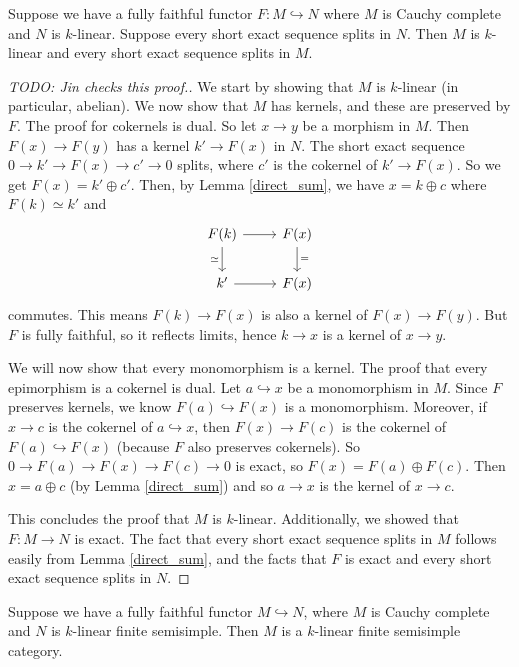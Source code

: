 \begin{lemma}\label{abelian}
  Suppose we have a fully faithful functor $F:M\hookrightarrow N$ where $M$ is
  Cauchy complete and $N$ is $k$-linear. Suppose every short exact sequence
  splits in $N$. Then $M$ is $k$-linear and every short exact sequence splits
  in $M$.
\end{lemma}

\begin{proof}
  [TODO: Jin checks this proof.]

  We start by showing that $M$ is $k$-linear (in particular, abelian). We now
  show that $M$ has kernels, and these are preserved by $F$. The proof for
  cokernels is dual. So let $x\to y$ be a morphism in $M$. Then $F(x)\to F(y)$ has
  a kernel $k'\to F(x)$ in $N$. The short exact sequence $0\to k'\to F(x)\to c'\to 0$
  splits, where $c'$ is the cokernel of $k'\to F(x)$. So we get $F(x)=k'\oplus c'$.
  Then, by Lemma \ref{direct_sum}, we have $x=k\oplus c$ where $F(k)\simeq k'$ and
  \[
    \begin{tikzcd}
      {F(k)} & {F(x)} \\
      {k'} & {F(x)} \arrow[from=1-1, to=1-2] \arrow["\simeq"', from=1-1, to=2-1] \arrow["{=}", from=1-2, to=2-2] \arrow[from=2-1, to=2-2]
    \end{tikzcd}
  \]
  commutes. This means $F(k)\to F(x)$ is also a kernel of $F(x)\to F(y)$. But
  $F$ is fully faithful, so it reflects limits, hence $k\to x$ is a kernel of
  $x\to y$.

  We will now show that every monomorphism is a kernel. The proof that every
  epimorphism is a cokernel is dual. Let $a\hookrightarrow x$ be a
  monomorphism in $M$. Since $F$ preserves kernels, we know
  $F(a)\hookrightarrow F(x)$ is a monomorphism. Moreover, if $x\to c$ is the
  cokernel of $a\hookrightarrow x$, then $F(x)\to F(c)$ is the cokernel of
  $F(a)\hookrightarrow F(x)$ (because $F$ also preserves cokernels). So $0\to F(a)\to F(x)\to F(c)\to 0$ is exact, so
  $F(x)=F(a)\oplus F(c)$. Then $x=a\oplus c$ (by Lemma \ref{direct_sum}) and
  so $a\to x$ is the kernel of $x\to c$.

  This concludes the proof that $M$ is $k$-linear. Additionally, we showed that $F:M\to N$ is exact. The fact that every short exact sequence splits in $M$ follows easily from
  Lemma \ref{direct_sum}, and the facts that $F$ is exact and every short
  exact sequence splits in $N$.
\end{proof}

\begin{proposition}\label{cau_semi}
  Suppose we have a fully faithful functor $M\hookrightarrow N$,
  where $M$ is Cauchy complete and $N$ is $k$-linear finite semisimple. Then
  $M$ is a $k$-linear finite semisimple category.
\end{proposition}


